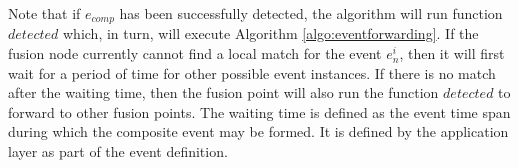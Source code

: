 Note that if \(e_{comp}\) has been successfully detected, the algorithm will run function \(detected\) which, in turn, will execute Algorithm \ref{algo:eventforwarding}. If the fusion node currently cannot find a local match for the event \(e_n^i\), then it will first wait for a period of time for other possible event instances. If there is no match after the waiting time, then the fusion point will also run the function \(detected\) to forward to other fusion points. The waiting time is defined as the event time span during which the composite event may be formed. It is defined by the application layer as part of the event definition.
